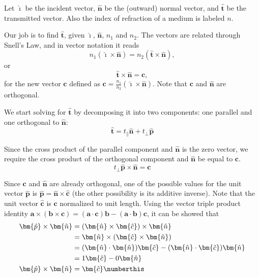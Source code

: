 
Let $\bm{\hat{\imath}}$ be the incident vector, $\bm{\hat{n}}$ be the (outward) normal vector, and  $\bm{\hat{t}}$ be the transmitted vector. Also the index of refraction of a medium
is labeled $n$.

Our job is to find $\bm{\hat{t}}$, given $\bm{\hat{\imath}}$, $\bm{\hat{n}}$, $n_1$ and $n_2$. The vectors are related through Snell's Law, and in vector notation it reads
\begin{equation}
    n_1 \left( \bm{\hat{\imath}} \times \bm{\hat{n}} \right) = n_2 \left( \bm{\hat{t}} \times \bm{\hat{n}} \right),
\end{equation}
or
\begin{equation}
    \bm{\hat{t}} \times \bm{\hat{n}} = \bm{c},
    \label{eqn:def_t}
\end{equation}  
for the new vector $\bm{c}$ defined as $\displaystyle \bm{c} = \frac{n_1}{n_2} \left( \bm{\hat{\imath}} \times \bm{\hat{n}} \right)$. Note that $\bm{c}$ and $\bm{\hat{n}}$ are
orthogonal.

We start solving for $\bm{\hat{t}}$ by decomposing it into two components: one parallel and one orthogonal to $\bm{\hat{n}}$:
\begin{equation}
    \bm{\hat{t}} = t_{\|} \bm{\hat{n}} + t_{\perp} \bm{\hat{p}}
\end{equation}

Since the cross product of the parallel component and $\bm{\hat{n}}$ is the zero vector, we require the cross product of the orthogonal component and $\bm{\hat{n}}$ be equal to $\bm{c}$.
\begin{equation}
    t_{\perp} \bm{\hat{p}} \times \bm{\hat{n}} = \bm{c}
    \label{eqn:def_t_perp}
\end{equation}

Since $\bm{c}$ and $\bm{\hat{n}}$ are already orthogonal, one of the possible values for the unit vector $\bm{\hat{p}}$ is $\bm{\hat{p}} = \bm{\hat{n}} \times \bm{\hat{c}}$ (the other
possibility is its additive inverse). Note that the unit vector $\bm{\hat{c}}$ is $\bm{c}$ normalized to unit length. Using the vector triple product identity $\bm{a} \times (\bm{b}
\times \bm{c}) = (\bm{a} \cdot \bm{c})\bm{b} - (\bm{a} \cdot \bm{b})\bm{c}$,
it can be showed that
\begin{align*}
    \bm{\hat{p}} \times \bm{\hat{n}} &= \left( \bm{\hat{n}} \times \bm{\hat{c}} \right) \times \bm{\hat{n}} \\
    &= \bm{\hat{n}} \times \left( \bm{\hat{c}} \times \bm{\hat{n}} \right) \\
    &= (\bm{\hat{n}} \cdot \bm{\hat{n}})\bm{\hat{c}} - (\bm{\hat{n}} \cdot \bm{\hat{c}})\bm{\hat{n}} \\
    &= 1\bm{\hat{c}} - 0\bm{\hat{n}} \\
    \bm{\hat{p}} \times \bm{\hat{n}} &= \bm{\hat{c}} \numberthis
\end{align*}

